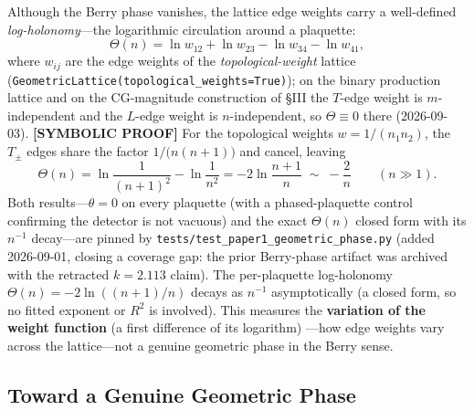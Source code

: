 \documentclass[aps,pra,twocolumn,superscriptaddress,longbibliography]{revtex4-2}
\begin{document}
Although the Berry phase vanishes, the lattice edge weights carry a
well-defined \emph{log-holonomy}---the logarithmic circulation around a
plaquette:
\begin{equation}
\Theta(n) = \ln w_{12} + \ln w_{23} - \ln w_{34} - \ln w_{41},
\label{eq:log_holonomy}
\end{equation}
where $w_{ij}$ are the edge weights of the \emph{topological-weight}
lattice (\texttt{GeometricLattice(topological\_weights=True)}); on the
binary production lattice and on the CG-magnitude construction of \S III
the $T$-edge weight is $m$-independent and the $L$-edge weight is
$n$-independent, so $\Theta \equiv 0$ there (2026-09-03).  \textbf{[SYMBOLIC PROOF]} For the
topological weights $w = 1/(n_1 n_2)$, the $T_\pm$ edges share the factor
$1/\bigl(n(n+1)\bigr)$ and cancel, leaving
\begin{equation}
\Theta(n) = \ln\!\frac{1}{(n+1)^2} - \ln\!\frac{1}{n^2}
           = -2\ln\!\frac{n+1}{n}
           \;\sim\; -\frac{2}{n}
           \qquad (n \gg 1).
\label{eq:log_holonomy_exact}
\end{equation}
Both results---$\theta = 0$ on every plaquette (with a phased-plaquette
control confirming the detector is not vacuous) and the exact
$\Theta(n)$ closed form with its $n^{-1}$ decay---are pinned by
\texttt{tests/test\_paper1\_geometric\_phase.py} (added 2026-09-01,
closing a coverage gap: the prior Berry-phase artifact was archived
with the retracted $k = 2.113$ claim).
The per-plaquette log-holonomy $\Theta(n) = -2\ln((n+1)/n)$
decays as $n^{-1}$ asymptotically (a closed form, so no fitted exponent or
$R^2$ is involved).  This measures the \textbf{variation of the weight function} (a first difference of its logarithm)
---how edge weights vary across the lattice---not a genuine geometric phase
in the Berry sense.

\subsection{Toward a Genuine Geometric Phase}
\end{document}

